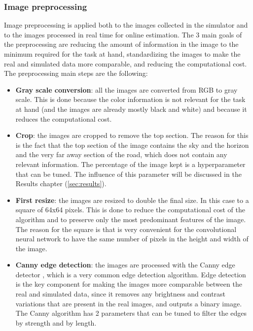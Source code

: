\documentclass[a4paper,12pt,sort&compress]{article}
\begin{document}
    \subsubsection*{Image preprocessing}
    Image preprocessing is applied both to the images collected in the simulator and to the images
    processed in real time for online estimation. The 3 main goals of the preprocessing are reducing the 
    amount of information in the image to the minimum required for the task at hand, standardizing
    the images to make the real and simulated data more comparable, and reducing the computational 
    cost. The preprocessing main steps are the following:
    \begin{itemize}
        \item \textbf{Gray scale conversion}: all the images are converted from RGB to gray scale.
        This is done because the color information is not relevant for the task at hand (and the
        images are already mostly black and white) and because it reduces the computational cost.
        \item \textbf{Crop}: the images are cropped to remove the top section. The reason for this
        is the fact that the top section of the image contains the sky and the horizon and the very
        far away section of the road, which does not contain any relevant information. The
        percentage of the image kept is a hyperparameter that can be tuned. The influence of this
        parameter will be discussed in the Results chapter (\ref*{sec:results}).
        \item \textbf{First resize}: the images are resized to double the final size. In this case
        to a square of 64x64 pixels. This is done to reduce the computational cost of the algorithm
        and to preserve only the most predominant features of the image. The reason for the square
        is that is very convenient for the convolutional neural network to have the same number of 
        pixels in the height and width of the image.
        \item \textbf{Canny edge detection}: the images are processed with the Canny edge detector
        \citep*{canny}, which is a very common edge detection algorithm. Edge detection is the key
        component for making the images more comparable between the real and simulated data, since
        it removes any brightness and contrast variations that are present in the real images, and
        outputs a binary image. The Canny algorithm has 2 parameters that can be tuned to filter the
        edges by strength and by length.   

\end{itemize}
\end{document}
